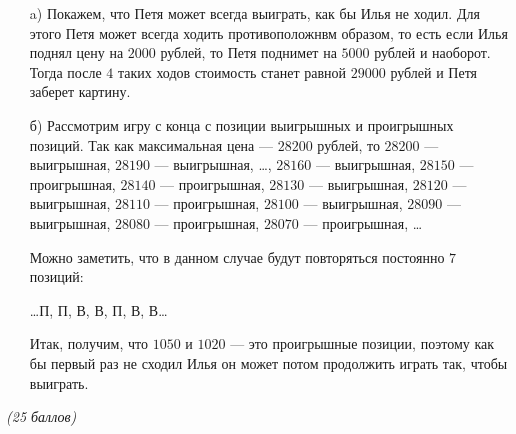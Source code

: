 \solutionSection
\begin{enumerate}
    \item[a)] Покажем, что Петя может всегда выиграть, как бы 
	Илья не ходил. Для этого Петя может всегда ходить противоположнвм образом,
	то есть если Илья поднял цену на $2000$ рублей, то Петя поднимет на $5000$
	рублей и наоборот. Тогда после $4$ таких ходов стоимость станет равной 
	$29000$ рублей и Петя заберет картину.
	
	\item[б)]  Рассмотрим игру с конца с позиции выигрышных и проигрышных позиций. Так как максимальная цена --- $28200$ рублей, то
	$28200$ --- выигрышная, $28190$ --- выигрышная, \dots, $28160$ --- выигрышная, 
	$28150$ --- проигрышная, $28140$ --- проигрышная, $28130$ --- выигрышная,
	$28120$ --- выигрышная, $28110$ --- проигрышная, $28100$ --- выигрышная,
	$28090$ --- выигрышная, $28080$ --- проигрышная, $28070$ --- проигрышная, \dots
	
    Можно заметить, что в данном случае будут повторяться постоянно $7$ позиций:
    
    \begin{center}	
	    \dots П, П, В, В, П, В, В\dots 
    \end{center}

	Итак, получим, что $1050$ и $1020$ --- это проигрышные позиции, поэтому 
	как бы первый раз не сходил Илья он может потом продолжить играть так,
	чтобы выиграть.
\end{enumerate}	


\additionalCriteria

\textit{(25 баллов)}

